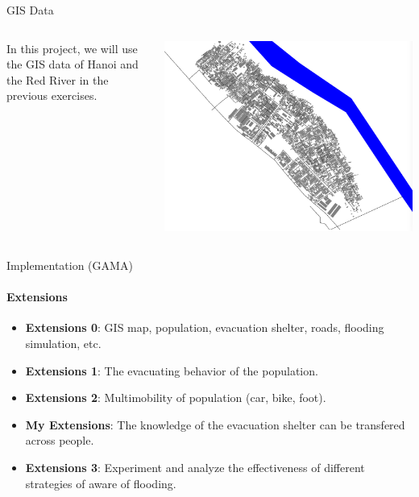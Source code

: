\documentclass{beamer}
\begin{document}
\begin{frame}[fragile]{GIS Data}



\begin{columns}
\begin{column}{0.5\textwidth}
In this project, we will use the GIS data of Hanoi and the Red River in the previous exercises.

\end{column}

\begin{column}{0.5\textwidth}
    \includegraphics[width=\textwidth]{img/GIS-map-hanoi-red-river-original.png}
\end{column}
\end{columns}

\end{frame}


\begin{frame}[fragile]{Implementation (GAMA)}
\framesubtitle{Extensions}

\begin{itemize}
    \item \textbf{Extensions 0}: GIS map, population, evacuation shelter, roads, flooding simulation, etc.
    \item \textbf{Extensions 1}: The evacuating behavior of the population.
    \item \textbf{Extensions 2}: Multimobility of population (car, bike, foot).
    \item \textbf{My Extensions}: The knowledge of the evacuation shelter can be transfered across people.
    \item \textbf{Extensions 3}: Experiment and analyze the effectiveness of different strategies of aware of flooding.
\end{itemize}

\end{frame}
\end{document}
